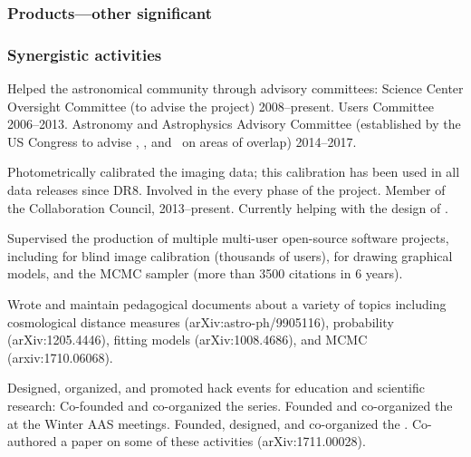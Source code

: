 \documentclass[12pt, fullpage, letterpaper]{article}
\begin{document}
\subsubsection*{Products---other significant} %

\subsubsection*{Synergistic activities} %
\begin{list}{}{\hogglist}
\item
Helped the astronomical community through advisory committees:
 Science Center Oversight Committee (to advise the  project) 2008--present.
 Users Committee 2006--2013.
Astronomy and Astrophysics Advisory Committee (established by the US
Congress to advise \NSF, \NASA, and \DOE\ on areas of overlap) 2014--2017.
\item
Photometrically calibrated the  imaging data; this
calibration has been used in all data releases since DR8.
Involved in the every phase of the
 project. Member of the
 Collaboration Council,
2013--present. Currently helping with the design of .
\item
Supervised the production of multiple multi-user open-source software projects,
including  for blind image calibration (thousands of users),
 for drawing graphical models, and the 
MCMC sampler (more than 3500 citations in 6 years).
\item
Wrote and maintain pedagogical documents about a variety of topics including
cosmological distance measures (arXiv:astro-ph/9905116),
probability (arXiv:1205.4446),
fitting models (arXiv:1008.4686), and
MCMC (arxiv:1710.06068).
\item
Designed, organized, and promoted hack events for education and scientific research:
Co-founded and co-organized the  series.
Founded and co-organized the  at the Winter AAS meetings.
Founded, designed, and co-organized the .
Co-authored a paper on some of these activities (arXiv:1711.00028).
\end{list}
\end{document}
